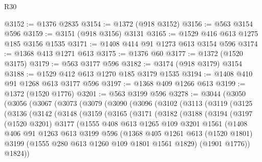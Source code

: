 \begin{lexlean}{R30}
\begin{coremodule}
@3152 := @1376 @2835
@3154 := @1372 (@918 @3152)
@3156 := @563 @3154 @596
@3159 := @3151 (@918 @3156) @3131
@3165 := @1529 @416 @613 @1275 @185 @3156 @1535
@3171 := @1408 @414 @91 @1273 @613 @3154 @596
@3174 := @1368 @413 @1271 @613
@3175 := @1376 @60
@3177 := @1372 (@1520 @3175)
@3179 := @563 @3177 @596
@3182 := @3174 (@918 @3179) @3154
@3188 := @1529 @412 @613 @1270 @185 @3179 @1535
@3194 := @1408 @410 @91 @1268 @613 @3177 @596
@3197 := @1368 @409 @1266 @613
@3199 := @1372 (@1520 @1776)
@3201 := @563 @3199 @596
@3278 := @3044
    (@3050
      (@3056
        (@3067
          (@3073
            (@3079
              (@3090
                (@3096
                  (@3102
                    (@3113
                      (@3119
                        (@3125
                          (@3136
                            (@3142
                              (@3148
                                (@3159
                                  (@3165
                                    (@3171
                                      (@3182
                                        (@3188
                                          (@3194
                                            (@3197
                                              (@1520 @3201)
                                              @3177
                                              (@1555
                                                @408
                                                @613
                                                @1265
                                                @109
                                                @3201
                                                @1561
                                                (@1408
                                                  @406
                                                  @91
                                                  @1263
                                                  @613
                                                  @3199
                                                  @596
                                                  (@1368
                                                    @405
                                                    @1261
                                                    @613
                                                    (@1520 @1801)
                                                    @3199
                                                    (@1555 @280 @613 @1260 @109 @1801 @1561 @1829)
                                                    (@1901 @1776))
                                                  @1824))

\end{coremodule}
\end{lexlean}
